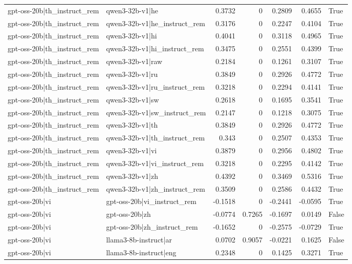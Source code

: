 \begin{table}
\begin{tabular}{l l r r r r l}
gpt-oss-20b|th_instruct_rem & qwen3-32b-v1|he & 0.3732 & 0 & 0.2809 & 0.4655 & True \\
gpt-oss-20b|th_instruct_rem & qwen3-32b-v1|he_instruct_rem & 0.3176 & 0 & 0.2247 & 0.4104 & True \\
gpt-oss-20b|th_instruct_rem & qwen3-32b-v1|hi & 0.4041 & 0 & 0.3118 & 0.4965 & True \\
gpt-oss-20b|th_instruct_rem & qwen3-32b-v1|hi_instruct_rem & 0.3475 & 0 & 0.2551 & 0.4399 & True \\
gpt-oss-20b|th_instruct_rem & qwen3-32b-v1|raw & 0.2184 & 0 & 0.1261 & 0.3107 & True \\
gpt-oss-20b|th_instruct_rem & qwen3-32b-v1|ru & 0.3849 & 0 & 0.2926 & 0.4772 & True \\
gpt-oss-20b|th_instruct_rem & qwen3-32b-v1|ru_instruct_rem & 0.3218 & 0 & 0.2294 & 0.4141 & True \\
gpt-oss-20b|th_instruct_rem & qwen3-32b-v1|sw & 0.2618 & 0 & 0.1695 & 0.3541 & True \\
gpt-oss-20b|th_instruct_rem & qwen3-32b-v1|sw_instruct_rem & 0.2147 & 0 & 0.1218 & 0.3075 & True \\
gpt-oss-20b|th_instruct_rem & qwen3-32b-v1|th & 0.3849 & 0 & 0.2926 & 0.4772 & True \\
gpt-oss-20b|th_instruct_rem & qwen3-32b-v1|th_instruct_rem & 0.343 & 0 & 0.2507 & 0.4353 & True \\
gpt-oss-20b|th_instruct_rem & qwen3-32b-v1|vi & 0.3879 & 0 & 0.2956 & 0.4802 & True \\
gpt-oss-20b|th_instruct_rem & qwen3-32b-v1|vi_instruct_rem & 0.3218 & 0 & 0.2295 & 0.4142 & True \\
gpt-oss-20b|th_instruct_rem & qwen3-32b-v1|zh & 0.4392 & 0 & 0.3469 & 0.5316 & True \\
gpt-oss-20b|th_instruct_rem & qwen3-32b-v1|zh_instruct_rem & 0.3509 & 0 & 0.2586 & 0.4432 & True \\
gpt-oss-20b|vi & gpt-oss-20b|vi_instruct_rem & -0.1518 & 0 & -0.2441 & -0.0595 & True \\
gpt-oss-20b|vi & gpt-oss-20b|zh & -0.0774 & 0.7265 & -0.1697 & 0.0149 & False \\
gpt-oss-20b|vi & gpt-oss-20b|zh_instruct_rem & -0.1652 & 0 & -0.2575 & -0.0729 & True \\
gpt-oss-20b|vi & llama3-8b-instruct|ar & 0.0702 & 0.9057 & -0.0221 & 0.1625 & False \\
gpt-oss-20b|vi & llama3-8b-instruct|eng & 0.2348 & 0 & 0.1425 & 0.3271 & True \\

\end{tabular}
\end{table}
